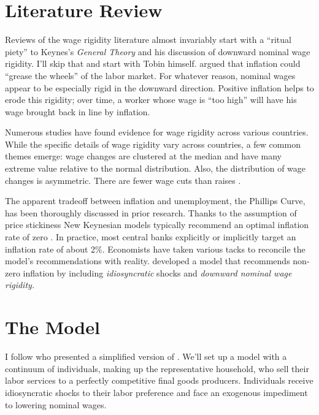\documentclass[12pt,a4paper]{scrartcl}            %
\begin{document}
\section{Literature Review}
\label{sec:literature_review}
Reviews of the wage rigidity literature almost invariably start with a ``ritual piety'' \citep{tobin_1972} to Keynes's \emph{General Theory} and his discussion of downward nominal wage rigidity.
I'll skip that and start with Tobin himself.
\cite{tobin_1972} argued that inflation could ``grease the wheels'' of the labor market.
For whatever reason, nominal wages appear to be especially rigid in the downward direction.
Positive inflation helps to erode this rigidity;
over time, a worker whose wage is ``too high'' will have his wage brought back in line by inflation.

Numerous studies have found evidence for wage rigidity across various countries.
While the specific details of wage rigidity vary across countries, a few common themes emerge:
wage changes are clustered at the median and have many extreme value relative to the normal distribution.  Also, the distribution of wage changes is asymmetric.  There are fewer wage cuts than raises \citep{dickens_et_al_2006}.

The apparent tradeoff between inflation and unemployment, the Phillips Curve, has been thoroughly discussed in prior research.
Thanks to the assumption of price stickiness New Keynesian models typically recommend an optimal inflation rate of zero \citep{schmitt-grohe_uribe_2010}.
In practice, most central banks explicitly or implicitly target an inflation rate of about 2\%.
Economists have taken various tacks to reconcile the model's recommendations with reality.
\cite{benigno_ricci_2011} developed a model that recommends non-zero inflation by including \emph{idiosyncratic} shocks and \emph{downward nominal wage rigidity.}

\section{The Model}
\label{sec:the_model}

I follow \cite{daly_hobijn_2013} who presented a simplified version of \cite{benigno_ricci_2011}.
We'll set up a model with a continuum of individuals, making up the representative household, who sell their labor services to a perfectly competitive final goods producers.
Individuals receive idiosyncratic shocks to their labor preference and face an exogenous impediment to lowering nominal wages.
\end{document}
